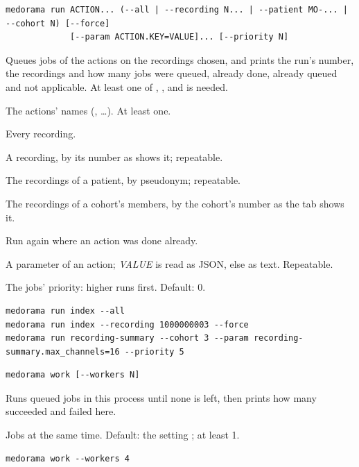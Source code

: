 \begin{lstlisting}[style=signature]
medorama run ACTION... (--all | --recording N... | --patient MO-... | --cohort N) [--force]
             [--param ACTION.KEY=VALUE]... [--priority N]
\end{lstlisting}
Queues jobs of the actions on the recordings chosen, and prints the run's number, the recordings
and how many jobs were queued, already done, already queued and not applicable. At least one of
, ,  and  is needed.
\begin{params}
\item[ACTION...] The actions' names (, \dots). At least one.
\item[--all] Every recording.
\item[--recording N] A recording, by its number as  shows it;
  repeatable.
\item[--patient MO-...] The recordings of a patient, by pseudonym; repeatable.
\item[--cohort N] The recordings of a cohort's members, by the cohort's number as the
   tab shows it.
\item[--force] Run again where an action was done already.
\item[--param ACTION.KEY=VALUE] A parameter of an action; \textit{VALUE} is read as JSON, else
  as text. Repeatable.
\item[--priority N] The jobs' priority: higher runs first. Default: 0.
\end{params}
\begin{lstlisting}[style=shell]
medorama run index --all
medorama run index --recording 1000000003 --force
medorama run recording-summary --cohort 3 --param recording-summary.max_channels=16 --priority 5
\end{lstlisting}

\begin{lstlisting}[style=signature]
medorama work [--workers N]
\end{lstlisting}
Runs queued jobs in this process until none is left, then prints how many succeeded and failed
here.
\begin{params}
\item[--workers N] Jobs at the same time. Default: the setting ; at least 1.
\end{params}
\begin{lstlisting}[style=shell]
medorama work --workers 4
\end{lstlisting}

